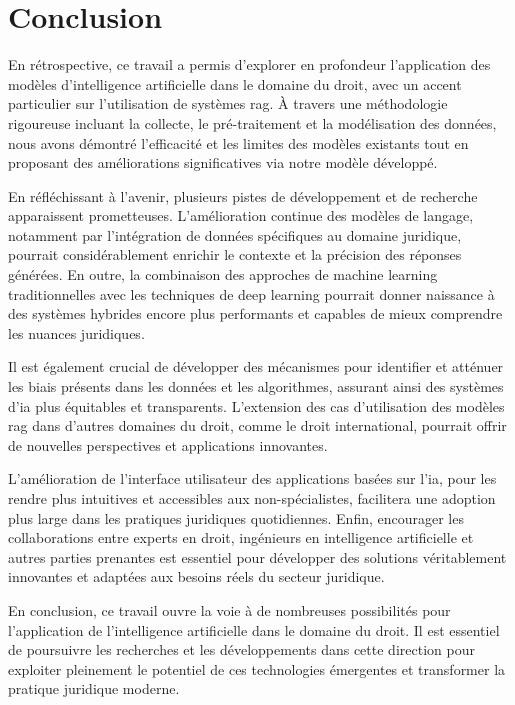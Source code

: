 
\chapter{Conclusion} %

\label{ch:4} %

En rétrospective, ce travail a permis d'explorer en profondeur l'application des modèles d'intelligence artificielle dans le domaine du droit, avec un accent particulier sur l'utilisation de systèmes \acf{rag}. À travers une méthodologie rigoureuse incluant la collecte, le pré-traitement et la modélisation des données, nous avons démontré l'efficacité et les limites des modèles existants tout en proposant des améliorations significatives via notre modèle développé.

 
En réfléchissant à l'avenir, plusieurs pistes de développement et de recherche apparaissent prometteuses. L'amélioration continue des modèles de langage, notamment par l'intégration de données spécifiques au domaine juridique, pourrait considérablement enrichir le contexte et la précision des réponses générées. En outre, la combinaison des approches de machine learning traditionnelles avec les techniques de deep learning pourrait donner naissance à des systèmes hybrides encore plus performants et capables de mieux comprendre les nuances juridiques.

Il est également crucial de développer des mécanismes pour identifier et atténuer les biais présents dans les données et les algorithmes, assurant ainsi des systèmes d'\ac{ia} plus équitables et transparents. L'extension des cas d'utilisation des modèles \ac{rag} dans d'autres domaines du droit, comme le droit international, pourrait offrir de nouvelles perspectives et applications innovantes.

L'amélioration de l'interface utilisateur des applications basées sur l'\ac{ia}, pour les rendre plus intuitives et accessibles aux non-spécialistes, facilitera une adoption plus large dans les pratiques juridiques quotidiennes. Enfin, encourager les collaborations entre experts en droit, ingénieurs en intelligence artificielle et autres parties prenantes est essentiel pour développer des solutions véritablement innovantes et adaptées aux besoins réels du secteur juridique.

En conclusion, ce travail ouvre la voie à de nombreuses possibilités pour l'application de l'intelligence artificielle dans le domaine du droit. Il est essentiel de poursuivre les recherches et les développements dans cette direction pour exploiter pleinement le potentiel de ces technologies émergentes et transformer la pratique juridique moderne.
